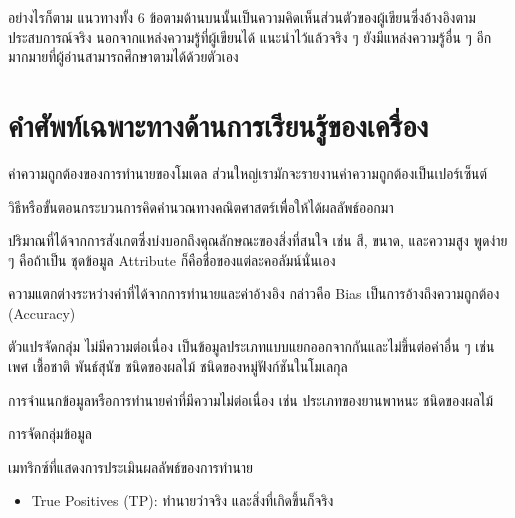 อย่างไรก็ตาม แนวทางทั้ง 6 ข้อตามด้านบนนั้นเป็นความคิดเห็นส่วนตัวของผู้เขียนซึ่งอ้างอิงตามประสบการณ์จริง นอกจากแหล่งความรู้ที่ผู้เขียนได้%
แนะนำไว้แล้วจริง ๆ ยังมีแหล่งความรู้อื่น ๆ อีกมากมายที่ผู้อ่านสามารถศึกษาตามได้ด้วยตัวเอง

\section{คำศัพท์เฉพาะทางด้านการเรียนรู้ของเครื่อง}
\label{sec:ml_term}

\begin{description}[style=nextline]
    \item[Accuracy] ค่าความถูกต้องของการทำนายของโมเดล ส่วนใหญ่เรามักจะรายงานค่าความถูกต้องเป็นเปอร์เซ็นต์

    \item[Algorithm] วิธีหรือขั้นตอนกระบวนการคิดคำนวณทางคณิตศาสตร์เพื่อให้ได้ผลลัพธ์ออกมา

    \item[Attribute] ปริมาณที่ได้จากการสังเกตซึ่งบ่งบอกถึงคุณลักษณะของสิ่งที่สนใจ เช่น สี, ขนาด, และความสูง พูดง่าย ๆ คือถ้าเป็น%
    ชุดข้อมูล Attribute ก็คือชื่อของแต่ละคอลัมน์นั่นเอง

    \item[Bias] ความแตกต่างระหว่างค่าที่ได้จากการทำนายและค่าอ้างอิง กล่าวคือ Bias เป็นการอ้างถึงความถูกต้อง (Accuracy)

    \item[Categorical Variables] ตัวแปรจัดกลุ่ม ไม่มีความต่อเนื่อง เป็นข้อมูลประเภทแบบแยกออกจากกันและไม่ขึ้นต่อค่าอื่น ๆ เช่น 
    เพศ เชื้อชาติ พันธ์สุนัข ชนิดของผลไม้ ชนิดของหมู่ฟังก์ชันในโมเลกุล

    \item[Classification] การจำแนกข้อมูลหรือการทำนายค่าที่มีความไม่ต่อเนื่อง เช่น ประเภทของยานพาหนะ ชนิดของผลไม้
 
    \item[Clustering] การจัดกลุ่มข้อมูล

    \item[Confusion matrix] เมทริกซ์ที่แสดงการประเมินผลลัพธ์ของการทำนาย
    \begin{itemize}
        \item True Positives (TP): ทำนายว่าจริง และสิ่งที่เกิดขึ้นก็จริง
        

\end{itemize}
\end{description}
